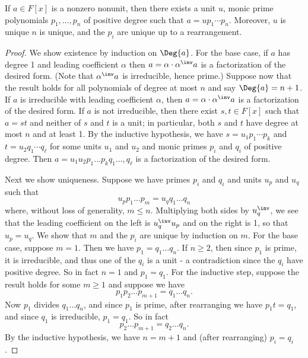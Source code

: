 \documentclass{memoir}
\begin{document}
\begin{prp}
If $a \in F[x]$ is a nonzero nonunit, then there exists a unit $u$, monic prime polynomials $p_1, \ldots, p_n$ of positive degree such that $a = up_1 \cdots p_n$. Moreover, $u$ is unique $n$ is unique, and the $p_i$ are unique up to a rearrangement.
\end{prp}

\begin{proof}
We show existence by induction on $\Deg{a}$. For the base case, if $a$ has degree 1 and leading coefficient $\alpha$ then $a = \alpha \cdot \alpha^\inv a$ is a factorization of the desired form. (Note that $\alpha^\inv a$ is irreducible, hence prime.) Suppose now that the result holds for all polynomials of degree at most $n$ and say $\Deg{a} = n+1$. If $a$ is irreducible with leading coefficient $\alpha$, then $a = \alpha \cdot \alpha^\inv a$ is a factorization of the desired form. If $a$ is not irreducible, then there exist $s,t \in F[x]$ such that $a = st$ and neither of $s$ and $t$ is a unit; in particular, both $s$ and $t$ have degree at most $n$ and at least 1. By the inductive hypothesis, we have $s = u_1 p_1 \cdots p_k$ and $t = u_2 q_1 \cdots q_\ell$ for some units $u_1$ and $u_2$ and monic primes $p_i$ and $q_i$ of positive degree. Then $a = u_1u_2p_1 \ldots p_k q_1 \ldots, q_\ell$ is a factorization of the desired form.

Next we show uniqueness. Suppose we have primes $p_i$ and $q_i$ and units $u_p$ and $u_q$ such that \[ u_p p_1 \ldots p_m = u_q q_1 \ldots q_n \] where, without loss of generality, $m \leq n$. Multiplying both sides by $u_q^\inv$, we see that the leading coefficient on the left is $u_q^\inv u_p$ and on the right is 1, so that $u_p = u_q$. We show that $m$ and the $p_i$ are unique by induction on $m$. For the base case, suppose $m = 1$. Then we have $p_1 = q_1 \ldots q_n$. If $n \geq 2$, then since $p_1$ is prime, it is irreducible, and thus one of the $q_i$ is a unit - a contradiction since the $q_i$ have positive degree. So in fact $n = 1$ and $p_1 = q_1$. For the inductive step, suppose the result holds for some $m \geq 1$ and suppose we have \[ p_1 p_2 \ldots p_{m+1} = q_1 \ldots q_n. \] Now $p_1$ divides $q_1 \ldots q_n$, and since $p_1$ is prime, after rearranging we have $p_1t = q_1$, and since $q_1$ is irreducible, $p_1 = q_1$. So in fact \[ p_2 \ldots p_{m+1} = q_2 \ldots q_n. \] By the inductive hypothesis, we have $n = m+1$ and (after rearranging) $p_i = q_i$.
\end{proof}
\end{document}

